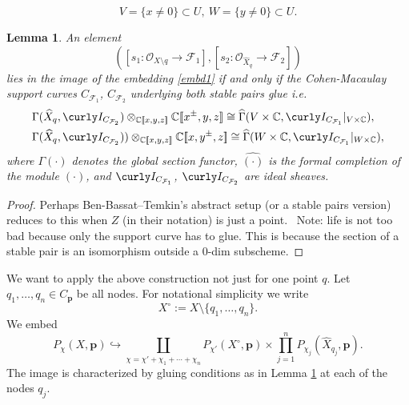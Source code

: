 \documentclass[12pt]{amsart}
\newtheorem{lemma}[theorem]{Lemma}
\theoremstyle{definition}
\theoremstyle{property}
\newcommand\I{\curly I}
\renewcommand\O{\mathcal O}
\newcommand\F{\mathcal F}
\newcommand\p{\mathbf{p}}
\newcommand\C{\mathbb C}
\renewcommand\_{^{}_}
\begin{document}
$$
V = \{ x \neq 0 \} \subset U, \ W = \{ y \neq 0 \} \subset U.
$$
\begin{lemma} \label{lem2}
An element
$$
([s_1 : \O_{X \setminus q} \rightarrow \F_1], [s_2 : \O_{\widehat{X}_q} \rightarrow \F_2] )
$$
lies in the image of the embedding \eqref{embd1} if and only if the Cohen-Macaulay support curves $C_{\F_1}$, $C_{\F_2}$ underlying both stable pairs glue i.e.
\begin{align*}
&\Gamma(\widehat{X}_q, \I_{C_{\F_2}}) \otimes_{\C[\![x,y,z]\!]} \C[\![x^{\pm},y,z]\!] \cong \widehat{\Gamma}(V \times \C, \I_{C_{\F_1}}|_{V \times \C}), \\
&\Gamma(\widehat{X}_q, \I_{C_{\F_2}})) \otimes_{\C[\![x,y,z]\!]} \C[\![x,y^{\pm},z]\!] \cong \widehat{\Gamma}(W \times \C, \I_{C_{\F_1}}|_{W \times \C}), 
\end{align*}
where $\Gamma(\cdot)$ denotes the global section functor, $\widehat{(\cdot)}$ is the formal completion of the module $(\cdot)$, and $\I_{C_{\F_1}}$, $\I_{C_{\F_2}}$ are ideal sheaves.
\end{lemma}
\begin{proof}
Perhaps Ben-Bassat--Temkin's \cite{BT} abstract setup (or a stable pairs version) reduces to this when $Z $ (in their notation) is just a point. \ Note: life is not too bad because only the support curve has to glue. This is because the section of a stable pair is an isomorphism outside a 0-dim subscheme.
\end{proof}

We want to apply the above construction not just for one point $q$. Let $q_1, \ldots, q_n \in C_{\p}$ be all nodes. For notational simplicity we write $$X^\circ := X \setminus \{q_1, \ldots, q_n\}.$$ We embed 
\[
P_\chi(X,\p) \hookrightarrow \coprod_{\chi = \chi' + \chi_1 +  \cdots + \chi_n}  P_{\chi'}(X^{\circ},\p) \times \prod_{j=1}^{n} P_{\chi_j}(\widehat{X}_{q_j},\p).
\]
The image is characterized by gluing conditions as in Lemma \ref{lem2} at each of the nodes $q_j$.
\end{document}
